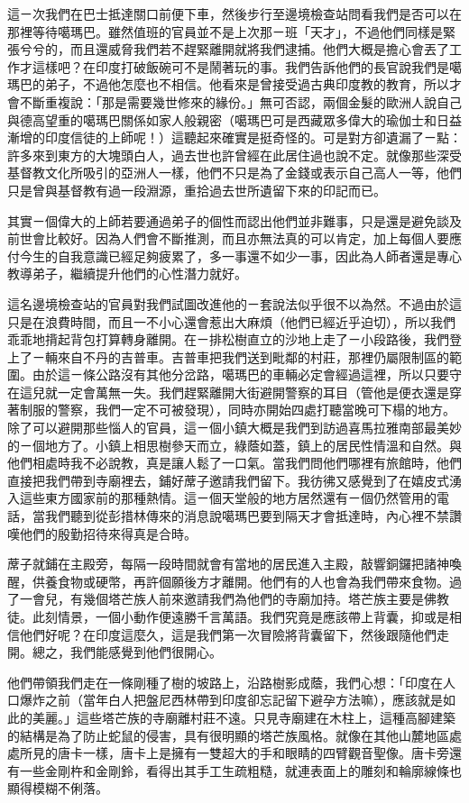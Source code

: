 這ㄧ次我們在巴士抵達關口前便下車，然後步行至邊境檢查站問看我們是否可以在那裡等待噶瑪巴。雖然值班的官員並不是上次那ㄧ班「天才」，不過他們同樣是緊張兮兮的，而且還威脅我們若不趕緊離開就將我們逮捕。他們大概是擔心會丟了工作才這樣吧？在印度打破飯碗可不是鬧著玩的事。我們告訴他們的長官說我們是噶瑪巴的弟子，不過他怎麼也不相信。他看來是曾接受過古典印度教的教育，所以才會不斷重複說：「那是需要幾世修來的緣份。」無可否認，兩個金髮的歐洲人說自己與德高望重的噶瑪巴關係如家人般親密（噶瑪巴可是西藏眾多偉大的瑜伽士和日益漸增的印度信徒的上師呢！）這聽起來確實是挺奇怪的。可是對方卻遺漏了ㄧ點：許多來到東方的大塊頭白人，過去世也許曾經在此居住過也說不定。就像那些深受基督教文化所吸引的亞洲人一樣，他們不只是為了金錢或表示自己高人一等，他們只是曾與基督教有過一段淵源，重拾過去世所遺留下來的印記而已。

其實ㄧ個偉大的上師若要通過弟子的個性而認出他們並非難事，只是還是避免談及前世會比較好。因為人們會不斷推測，而且亦無法真的可以肯定，加上每個人要應付今生的自我意識已經足夠疲累了，多一事還不如少一事，因此為人師者還是專心教導弟子，繼續提升他們的心性潛力就好。

這名邊境檢查站的官員對我們試圖改進他的ㄧ套說法似乎很不以為然。不過由於這只是在浪費時間，而且一不小心還會惹出大麻煩（他們已經近乎迫切），所以我們乖乖地揹起背包打算轉身離開。在ㄧ排松樹直立的沙地上走了ㄧ小段路後，我們登上了ㄧ輛來自不丹的吉普車。吉普車把我們送到毗鄰的村莊，那裡仍屬限制區的範圍。由於這ㄧ條公路沒有其他分岔路，噶瑪巴的車輛必定會經過這裡，所以只要守在這兒就一定會萬無一失。我們趕緊離開大街避開警察的耳目（管他是便衣還是穿著制服的警察，我們一定不可被發現），同時亦開始四處打聽當晚可下榻的地方。除了可以避開那些惱人的官員，這ㄧ個小鎮大概是我們到訪過喜馬拉雅南部最美妙的ㄧ個地方了。小鎮上相思樹參天而立，綠蔭如蓋，鎮上的居民性情溫和自然。與他們相處時我不必說教，真是讓人鬆了一口氣。當我們問他們哪裡有旅館時，他們直接把我們帶到寺廟裡去，鋪好蓆子邀請我們留下。我彷彿又感覺到了在嬉皮式湧入這些東方國家前的那種熱情。這ㄧ個天堂般的地方居然還有ㄧ個仍然管用的電話，當我們聽到從彭措林傳來的消息說噶瑪巴要到隔天才會抵達時，內心裡不禁讚嘆他們的殷勤招待來得真是合時。

蓆子就鋪在主殿旁，每隔一段時間就會有當地的居民進入主殿，敲響銅鑼把諸神喚醒，供養食物或硬幣，再許個願後方才離開。他們有的人也會為我們帶來食物。過了一會兒，有幾個塔芒族人前來邀請我們為他們的寺廟加持。塔芒族主要是佛教徒。此刻情景，一個小動作便遠勝千言萬語。我們究竟是應該帶上背囊，抑或是相信他們好呢？在印度這麼久，這是我們第一次冒險將背囊留下，然後跟隨他們走開。總之，我們能感覺到他們很開心。

他們帶領我們走在一條剛種了樹的坡路上，沿路樹影成蔭，我們心想：「印度在人口爆炸之前（當年白人把盤尼西林帶到印度卻忘記留下避孕方法嘛），應該就是如此的美麗。」這些塔芒族的寺廟離村莊不遠。只見寺廟建在木柱上，這種高腳建築的結構是為了防止蛇鼠的侵害，具有很明顯的塔芒族風格。就像在其他山麓地區處處所見的唐卡一樣，唐卡上是擁有一雙超大的手和眼睛的四臂觀音聖像。唐卡旁還有一些金剛杵和金剛鈴，看得出其手工生疏粗糙，就連表面上的雕刻和輪廓線條也顯得模糊不俐落。

